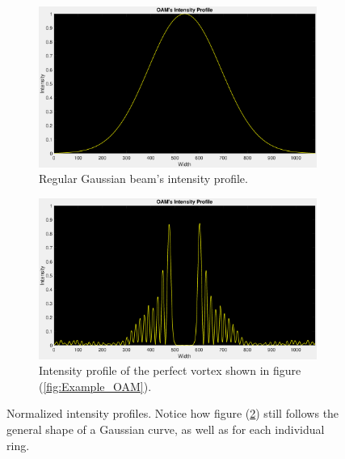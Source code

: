\begin{figure}[htbp]
    \centering
    \begin{subfigure}[b]{0.45\textwidth}
        \centering
        \includegraphics[width=\textwidth]{images/c02/OAM/Gauss_Profile.eps}
        \caption{Regular Gaussian beam's intensity profile.}
        \label{fig:example_Gaussian_profile}
    \end{subfigure}
    \hfill
    \begin{subfigure}[b]{0.45\textwidth}
        \centering
        \includegraphics[width=\textwidth]{images/c02/OAM/Gaussian_Profile.eps}
        \caption{Intensity profile of the perfect vortex shown in figure (\ref{fig:Example_OAM}).}
        \label{fig:example_perfect_OAM_profile}
    \end{subfigure}
    \caption{Normalized intensity profiles. Notice how figure (\ref{fig:example_perfect_OAM_profile}) still follows the general shape of a Gaussian curve, as well as for each individual ring.}
    \label{fig:Example_Intesity_Profiles}
\end{figure}

